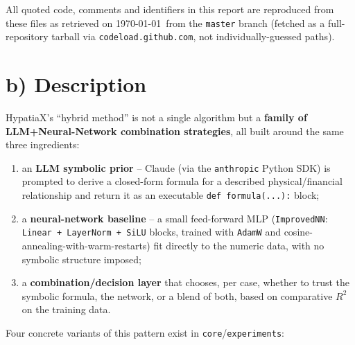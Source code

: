 \documentclass[11pt,a4paper]{article}
\newcommand{\code}[1]{\texttt{\small #1}}
\begin{document}
All quoted code, comments and identifiers in this report are reproduced
from these files as retrieved on \today\ from the \code{master} branch
(fetched as a full-repository tarball via \code{codeload.github.com}, not
individually-guessed paths).

\section{b) Description}

HypatiaX's ``hybrid method'' is not a single algorithm but a \textbf{family
of LLM+Neural-Network combination strategies}, all built around the same
three ingredients:

\begin{enumerate}
  \item an \textbf{LLM symbolic prior} -- Claude (via the \code{anthropic}
        Python SDK) is prompted to derive a closed-form formula for a
        described physical/financial relationship and return it as an
        executable \code{def formula(...):} block;
  \item a \textbf{neural-network baseline} -- a small feed-forward MLP
        (\code{ImprovedNN}: \code{Linear + LayerNorm + SiLU} blocks, trained
        with \code{AdamW} and cosine-annealing-with-warm-restarts) fit
        directly to the numeric data, with no symbolic structure imposed;
  \item a \textbf{combination/decision layer} that chooses, per case,
        whether to trust the symbolic formula, the network, or a blend of
        both, based on comparative $R^2$ on the training data.
\end{enumerate}

Four concrete variants of this pattern exist in \code{core}/\code{experiments}:
\end{document}

